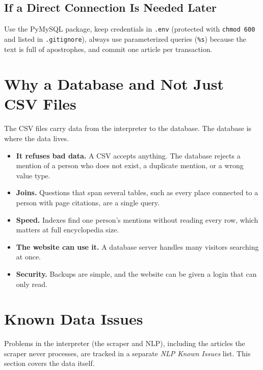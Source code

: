 \documentclass[11pt]{article}
\newcommand{\code}[1]{\texttt{#1}}
\begin{document}
\subsection{If a Direct Connection Is Needed Later}

Use the PyMySQL package, keep credentials in \code{.env} (protected with
\code{chmod 600} and listed in \code{.gitignore}), always use
parameterized queries (\code{\%s}) because the text is full of
apostrophes, and commit one article per transaction.

\section{Why a Database and Not Just CSV Files}

The CSV files carry data from the interpreter to the database. The
database is where the data lives.

\begin{itemize}
  \item \textbf{It refuses bad data.} A CSV accepts anything. The database
  rejects a mention of a person who does not exist, a duplicate mention, or
  a wrong value type.
  \item \textbf{Joins.} Questions that span several tables, such as every
  place connected to a person with page citations, are a single query.
  \item \textbf{Speed.} Indexes find one person's mentions without reading
  every row, which matters at full encyclopedia size.
  \item \textbf{The website can use it.} A database server handles many
  visitors searching at once.
  \item \textbf{Security.} Backups are simple, and the website can be given
  a login that can only read.
\end{itemize}

\section{Known Data Issues}

Problems in the interpreter (the scraper and NLP), including the articles
the scraper never processes, are tracked in a separate \textit{NLP Known
Issues} list. This section covers the data itself.
\end{document}
